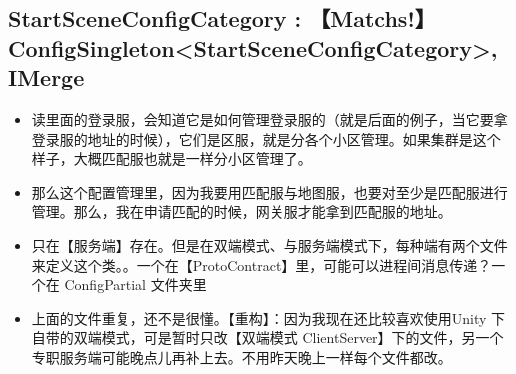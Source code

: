 \documentclass[9pt, b5paper]{article}
\begin{document}
\subsection{StartSceneConfigCategory : 【Matchs!】ConfigSingleton<StartSceneConfigCategory>, IMerge}
\label{sec-2-8}
\begin{itemize}
\item 读里面的登录服，会知道它是如何管理登录服的（就是后面的例子，当它要拿登录服的地址的时候），它们是区服，就是分各个小区管理。如果集群是这个样子，大概匹配服也就是一样分小区管理了。
\item 那么这个配置管理里，因为我要用匹配服与地图服，也要对至少是匹配服进行管理。那么，我在申请匹配的时候，网关服才能拿到匹配服的地址。
\item 只在【服务端】存在。但是在双端模式、与服务端模式下，每种端有两个文件来定义这个类。。一个在【ProtoContract】里，可能可以进程间消息传递？一个在 ConfigPartial 文件夹里
\item 上面的文件重复，还不是很懂。【重构】：因为我现在还比较喜欢使用Unity 下自带的双端模式，可是暂时只改【双端模式 ClientServer】下的文件，另一个专职服务端可能晚点儿再补上去。不用昨天晚上一样每个文件都改。
\end{itemize}
\end{document}
